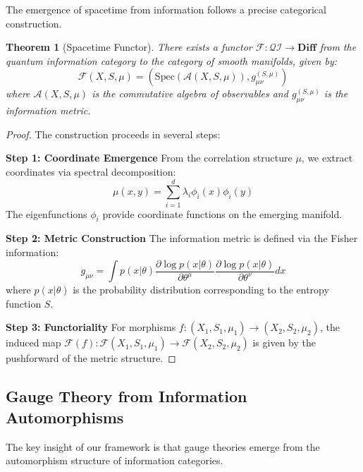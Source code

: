 \documentclass{article}
\newtheorem{theorem}{Theorem}[section]
\begin{document}
The emergence of spacetime from information follows a precise categorical construction.

\begin{theorem}[Spacetime Functor]
\label{thm:spacetime_functor}
There exists a functor $\mathcal{F}: \mathcal{Q}\mathcal{I} \to \mathbf{Diff}$ from the quantum information category to the category of smooth manifolds, given by:
\begin{equation}
\mathcal{F}(X, S, \mu) = \left(\text{Spec}(\mathcal{A}(X, S, \mu)), g_{\mu\nu}^{(S,\mu)}\right)
\end{equation}
where $\mathcal{A}(X, S, \mu)$ is the commutative algebra of observables and $g_{\mu\nu}^{(S,\mu)}$ is the information metric.
\end{theorem}

\begin{proof}
The construction proceeds in several steps:

\textbf{Step 1: Coordinate Emergence}
From the correlation structure $\mu$, we extract coordinates via spectral decomposition:
\begin{equation}
\mu(x, y) = \sum_{i=1}^d \lambda_i \phi_i(x) \phi_i(y)
\end{equation}
The eigenfunctions $\phi_i$ provide coordinate functions on the emerging manifold.

\textbf{Step 2: Metric Construction}
The information metric is defined via the Fisher information:
\begin{equation}
g_{\mu\nu} = \int p(x|\theta) \frac{\partial \log p(x|\theta)}{\partial \theta^\mu} \frac{\partial \log p(x|\theta)}{\partial \theta^\nu} dx
\end{equation}
where $p(x|\theta)$ is the probability distribution corresponding to the entropy function $S$.

\textbf{Step 3: Functoriality}
For morphisms $f: (X_1, S_1, \mu_1) \to (X_2, S_2, \mu_2)$, the induced map $\mathcal{F}(f): \mathcal{F}(X_1, S_1, \mu_1) \to \mathcal{F}(X_2, S_2, \mu_2)$ is given by the pushforward of the metric structure.
\end{proof}

\subsection{Gauge Theory from Information Automorphisms}

The key insight of our framework is that gauge theories emerge from the automorphism structure of information categories.
\end{document}
